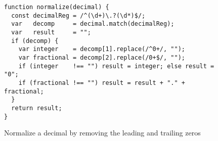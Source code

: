 \begin{figure}[htbp]
\begin{center}
\begin{verbatim}
function normalize(decimal) {
  const decimalReg = /^(\d+)\.?(\d*)$/;
  var   decomp     = decimal.match(decimalReg);
  var   result     = "";
  if (decomp) {
    var integer    = decomp[1].replace(/^0+/, "");
    var fractional = decomp[2].replace(/0+$/, "");
    if (integer    !== "") result = integer; else result = "0"; 
    if (fractional !== "") result = result + "." + fractional;
  }
  return result;
}
\end{verbatim}
\end{center}
\caption{Normalize a decimal by removing the leading and trailing zeros}
 \label{fig-run-exmp-normalize}
\end{figure}

